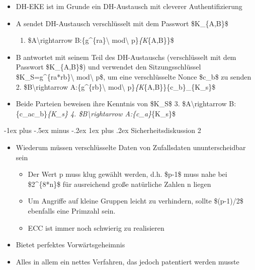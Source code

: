 \documentclass[a4paper]{article}
\makeatletter
\renewcommand{\subsubsection}{\@startsection{subsubsection}{3}{0mm}%
 {-1ex plus -.5ex minus -.2ex}%
 {1ex plus .2ex}%
 {\normalfont\small\bfseries}}
\makeatother
\begin{document}
\begin{multicols}{3}
    \begin{itemize}
        \item
              DH-EKE ist im Grunde ein DH-Austausch mit cleverer Authentifizierung
        \item
              A sendet DH-Austausch verschlüsselt mit dem Passwort \$K\_\{A,B\}\$

              \begin{enumerate}
                  \def\labelenumi{\arabic{enumi}.}
                  \item
                        \$A\textbackslash rightarrow B:\{g\^{}\{ra\}\textbackslash{}
                        mod\textbackslash{} p\}\emph{\{K}\{A,B\}\}\$
              \end{enumerate}
        \item
              B antwortet mit seinem Teil des DH-Austauschs (verschlüsselt mit dem
              Passwort \$K\_\{A,B\}\$) und verwendet den Sitzungsschlüssel
              \$K\_S=g\^{}\{ra*rb\}\textbackslash{} mod\textbackslash{} p\$, um eine
              verschlüsselte Nonce \$c\_b\$ zu senden 2.
              \$B\textbackslash rightarrow A:\{g\^{}\{rb\}\textbackslash{}
              mod\textbackslash{} p\}\emph{\{K}\{A,B\}\}\{c\_b\}\_\{K\_s\}\$
        \item
              Beide Parteien beweisen ihre Kenntnis von \$K\_S\$ 3.
              \$A\textbackslash rightarrow
              B:\{c\_a\textbar\textbar c\_b\}\emph{\{K\_s\} 4.
                  \$B\textbackslash rightarrow A:\{c\_a\}}\{K\_s\}\$
    \end{itemize}


    \subsubsection{Sicherheitsdiskussion 2}

    \begin{itemize}
        \item
              Wiederum müssen verschlüsselte Daten von Zufallsdaten ununterscheidbar
              sein

              \begin{itemize}
                  \item
                        Der Wert p muss klug gewählt werden, d.h. \$p-1\$ muss nahe bei
                        \$2\^{}\{8*n\}\$ für ausreichend große natürliche Zahlen n liegen
                  \item
                        Um Angriffe auf kleine Gruppen leicht zu verhindern, sollte
                        \$(p-1)/2\$ ebenfalls eine Primzahl sein.
                  \item
                        ECC ist immer noch schwierig zu realisieren
              \end{itemize}
        \item
              Bietet perfektes Vorwärtsgeheimnis
        \item
              Alles in allem ein nettes Verfahren, das jedoch patentiert werden
              musste


\end{itemize}
\end{multicols}
\end{document}
